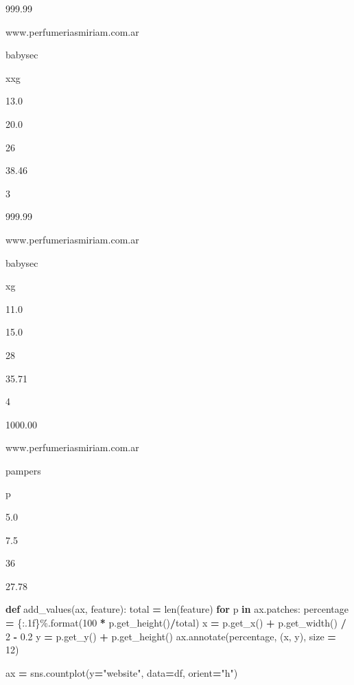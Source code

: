 \documentclass[
]{article}
\newenvironment{Shaded}{\begin{snugshade}}{\end{snugshade}}
\newcommand{\BuiltInTok}[1]{#1}
\newcommand{\ControlFlowTok}[1]{\textcolor[rgb]{0.13,0.29,0.53}{\textbf{#1}}}
\newcommand{\DecValTok}[1]{\textcolor[rgb]{0.00,0.00,0.81}{#1}}
\newcommand{\FloatTok}[1]{\textcolor[rgb]{0.00,0.00,0.81}{#1}}
\newcommand{\KeywordTok}[1]{\textcolor[rgb]{0.13,0.29,0.53}{\textbf{#1}}}
\newcommand{\NormalTok}[1]{#1}
\newcommand{\OperatorTok}[1]{\textcolor[rgb]{0.81,0.36,0.00}{\textbf{#1}}}
\newcommand{\SpecialCharTok}[1]{\textcolor[rgb]{0.00,0.00,0.00}{#1}}
\newcommand{\StringTok}[1]{\textcolor[rgb]{0.31,0.60,0.02}{#1}}
\begin{document}
999.99

www.perfumeriasmiriam.com.ar

babysec

xxg

13.0

20.0

26

38.46

3

999.99

www.perfumeriasmiriam.com.ar

babysec

xg

11.0

15.0

28

35.71

4

1000.00

www.perfumeriasmiriam.com.ar

pampers

p

5.0

7.5

36

27.78

\begin{Shaded}
\begin{Highlighting}[]
\KeywordTok{def}\NormalTok{ add\_values(ax, feature):}
\NormalTok{    total }\OperatorTok{=} \BuiltInTok{len}\NormalTok{(feature)}
    \ControlFlowTok{for}\NormalTok{ p }\KeywordTok{in}\NormalTok{ ax.patches:}
\NormalTok{        percentage }\OperatorTok{=} \StringTok{\textquotesingle{}}\SpecialCharTok{\{:.1f\}}\StringTok{\%\textquotesingle{}}\NormalTok{.}\BuiltInTok{format}\NormalTok{(}\DecValTok{100} \OperatorTok{*}\NormalTok{ p.get\_height()}\OperatorTok{/}\NormalTok{total)}
\NormalTok{        x }\OperatorTok{=}\NormalTok{ p.get\_x() }\OperatorTok{+}\NormalTok{ p.get\_width() }\OperatorTok{/} \DecValTok{2} \OperatorTok{{-}} \FloatTok{0.2}
\NormalTok{        y }\OperatorTok{=}\NormalTok{ p.get\_y() }\OperatorTok{+}\NormalTok{ p.get\_height()}
\NormalTok{        ax.annotate(percentage, (x, y), size }\OperatorTok{=} \DecValTok{12}\NormalTok{)}

\NormalTok{ax }\OperatorTok{=}\NormalTok{ sns.countplot(y}\OperatorTok{=}\StringTok{"website"}\NormalTok{, data}\OperatorTok{=}\NormalTok{df, orient}\OperatorTok{=}\StringTok{"h"}\NormalTok{)}
\end{Highlighting}
\end{Shaded}
\end{document}
